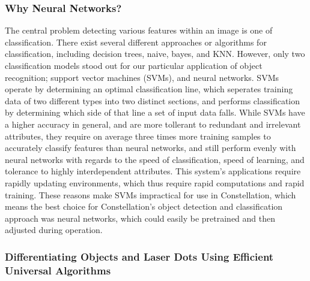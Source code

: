 \subsubsection{Why Neural Networks?}
The central problem detecting various features within an image is one of classification. There exist several different approaches or algorithms for classification, including decision trees, naive, bayes, and KNN. However, only two classification models stood out for our particular application of object recognition; support vector machines (SVMs), and neural networks. SVMs operate by determining an optimal classification line, which seperates training data of two different types into two distinct sections, and performs classification by determining which side of that line a set of input data falls. While SVMs have a higher accuracy in general, and are more tollerant to redundant and irrelevant attributes, they require on average three times more training samples to accurately classify features than neural networks, and still perform evenly with neural networks with regards to the speed of classification, speed of learning, and tolerance to highly interdependent attributes. This system's applications require rapidly updating environments, which thus require rapid computations and rapid training. These reasons make SVMs impractical for use in Constellation, which means the best choice for Constellation's object detection and classification approach was neural networks, which could easily be pretrained and then adjusted during operation.
\subsubsection{Differentiating Objects and Laser Dots Using Efficient Universal Algorithms}